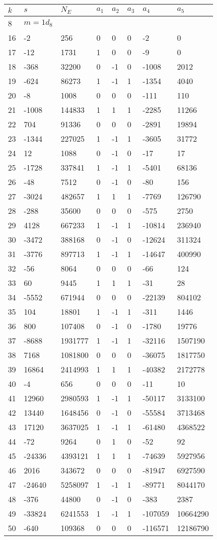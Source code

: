 \documentclass{amsart}
\begin{document}
\begin{longtable}{|l|l|l|lllll|}
\hline
$k$ & $s$ & $N_E$ & $a_1$ & $a_2$ & $a_3$ & $a_4$ & $a_5$\\
\hline
8&$m=1d_{8}$&&\multicolumn{5}{c|}{}\\
16&-2&256&0&0&0&-2&0\\
17&-12&1731&1&0&0&-9&0\\
18&-368&32200&0&-1&0&-1008&2012\\
19&-624&86273&1&-1&1&-1354&4040\\
20&-8&1008&0&0&0&-111&110\\
21&-1008&144833&1&1&1&-2285&11266\\
22&704&91336&0&0&0&-2891&19894\\
23&-1344&227025&1&-1&1&-3605&31772\\
24&12&1088&0&-1&0&-17&17\\
25&-1728&337841&1&-1&1&-5401&68136\\
26&-48&7512&0&-1&0&-80&156\\
27&-3024&482657&1&1&1&-7769&126790\\
28&-288&35600&0&0&0&-575&2750\\
29&4128&667233&1&-1&1&-10814&236940\\
30&-3472&388168&0&-1&0&-12624&311324\\
31&-3776&897713&1&-1&1&-14647&400990\\
32&-56&8064&0&0&0&-66&124\\
33&60&9445&1&1&1&-31&28\\
34&-5552&671944&0&0&0&-22139&804102\\
35&104&18801&1&-1&1&-311&1446\\
36&800&107408&0&-1&0&-1780&19776\\
37&-8688&1931777&1&-1&1&-32116&1507190\\
38&7168&1081800&0&0&0&-36075&1817750\\
39&16864&2414993&1&1&1&-40382&2172778\\
40&-4&656&0&0&0&-11&10\\
41&12960&2980593&1&-1&1&-50117&3133100\\
42&13440&1648456&0&-1&0&-55584&3713468\\
43&17120&3637025&1&-1&1&-61480&4368522\\
44&-72&9264&0&1&0&-52&92\\
45&-24336&4393121&1&1&1&-74639&5927956\\
46&2016&343672&0&0&0&-81947&6927590\\
47&-24640&5258097&1&-1&1&-89771&8044170\\
48&-376&44800&0&-1&0&-383&2387\\
49&-33824&6241553&1&-1&1&-107059&10664290\\
50&-640&109368&0&0&0&-116571&12186790\\
\hline
\end{longtable}
\end{document}
